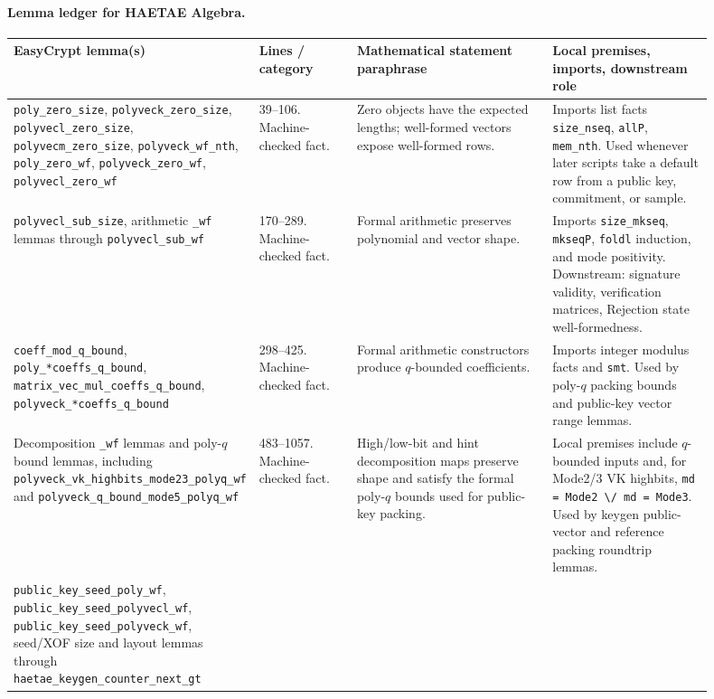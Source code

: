 \documentclass[11pt]{report}
\DeclareRobustCommand{\ec}[1]{\ifmmode\text{\nolinkurl{#1}}\else\nolinkurl{#1}\fi}
\theoremstyle{definition}
\theoremstyle{plain}
\begin{document}
\paragraph{Lemma ledger for HAETAE Algebra.}
{\footnotesize
\begin{longtable}{p{0.25\linewidth}p{0.14\linewidth}p{0.28\linewidth}p{0.23\linewidth}}
\toprule
\textbf{EasyCrypt lemma(s)} & \textbf{Lines / category} &
\textbf{Mathematical statement paraphrase} &
\textbf{Local premises, imports, downstream role} \\
\midrule
\ec{poly\_zero\_size}, \ec{polyveck\_zero\_size},
\ec{polyvecl\_zero\_size}, \ec{polyvecm\_zero\_size},
\ec{polyveck\_wf\_nth}, \ec{poly\_zero\_wf},
\ec{polyveck\_zero\_wf}, \ec{polyvecl\_zero\_wf} &
39--106. Machine-checked fact. &
Zero objects have the expected lengths; well-formed vectors expose
well-formed rows. &
Imports list facts \ec{size\_nseq}, \ec{allP}, \ec{mem\_nth}.  Used whenever
later scripts take a default row from a public key, commitment, or sample. \\
\midrule
\ec{polyvecl\_sub\_size}, arithmetic \ec{\_wf} lemmas through
\ec{polyvecl\_sub\_wf} &
170--289. Machine-checked fact. &
Formal arithmetic preserves polynomial and vector shape. &
Imports \ec{size\_mkseq}, \ec{mkseqP}, \ec{foldl} induction, and mode
positivity.  Downstream: signature validity, verification matrices, Rejection
state well-formedness. \\
\midrule
\ec{coeff\_mod\_q\_bound}, \ec{poly\_*coeffs\_q\_bound},
\ec{matrix\_vec\_mul\_coeffs\_q\_bound},
\ec{polyveck\_*coeffs\_q\_bound} &
298--425. Machine-checked fact. &
Formal arithmetic constructors produce \(q\)-bounded coefficients. &
Imports integer modulus facts and \ec{smt}.  Used by poly-\(q\) packing bounds
and public-key vector range lemmas. \\
\midrule
Decomposition \ec{\_wf} lemmas and poly-\(q\) bound lemmas,
including \ec{polyveck\_vk\_highbits\_mode23\_polyq\_wf} and
\ec{polyveck\_q\_bound\_mode5\_polyq\_wf} &
483--1057. Machine-checked fact. &
High/low-bit and hint decomposition maps preserve shape and satisfy the
formal poly-\(q\) bounds used for public-key packing. &
Local premises include \(q\)-bounded inputs and, for Mode2/3 VK highbits,
\ec{md = Mode2 \/ md = Mode3}.  Used by keygen public-vector and reference
packing roundtrip lemmas. \\
\midrule
\ec{public\_key\_seed\_poly\_wf},
\ec{public\_key\_seed\_polyvecl\_wf},
\ec{public\_key\_seed\_polyveck\_wf}, seed/XOF size and layout lemmas through
\ec{haetae\_keygen\_counter\_next\_gt} &

\end{longtable}}
\end{document}
